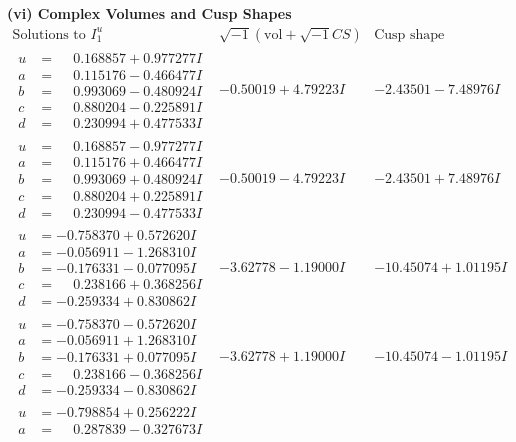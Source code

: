 \documentclass[1p]{elsarticle_modified}
\theoremstyle{definition}
\newcommand{\I}{\sqrt{-1}}
\begin{document}
\newpage\flushleft \textbf{(vi) Complex Volumes and Cusp Shapes}
$$\begin{array}{c|c|c}  
\text{Solutions to }I^u_{1}& \I (\text{vol} + \sqrt{-1}CS) & \text{Cusp shape}\\
 \hline 
\begin{aligned}
u &= \phantom{-}0.168857 + 0.977277 I \\
a &= \phantom{-}0.115176 - 0.466477 I \\
b &= \phantom{-}0.993069 - 0.480924 I \\
c &= \phantom{-}0.880204 - 0.225891 I \\
d &= \phantom{-}0.230994 + 0.477533 I\end{aligned}
 & -0.50019 + 4.79223 I & -2.43501 - 7.48976 I \\ \hline\begin{aligned}
u &= \phantom{-}0.168857 - 0.977277 I \\
a &= \phantom{-}0.115176 + 0.466477 I \\
b &= \phantom{-}0.993069 + 0.480924 I \\
c &= \phantom{-}0.880204 + 0.225891 I \\
d &= \phantom{-}0.230994 - 0.477533 I\end{aligned}
 & -0.50019 - 4.79223 I & -2.43501 + 7.48976 I \\ \hline\begin{aligned}
u &= -0.758370 + 0.572620 I \\
a &= -0.056911 - 1.268310 I \\
b &= -0.176331 - 0.077095 I \\
c &= \phantom{-}0.238166 + 0.368256 I \\
d &= -0.259334 + 0.830862 I\end{aligned}
 & -3.62778 - 1.19000 I & -10.45074 + 1.01195 I \\ \hline\begin{aligned}
u &= -0.758370 - 0.572620 I \\
a &= -0.056911 + 1.268310 I \\
b &= -0.176331 + 0.077095 I \\
c &= \phantom{-}0.238166 - 0.368256 I \\
d &= -0.259334 - 0.830862 I\end{aligned}
 & -3.62778 + 1.19000 I & -10.45074 - 1.01195 I \\ \hline\begin{aligned}
u &= -0.798854 + 0.256222 I \\
a &= \phantom{-}0.287839 - 0.327673 I \\

\end{aligned}
\end{array}$$
\end{document}
